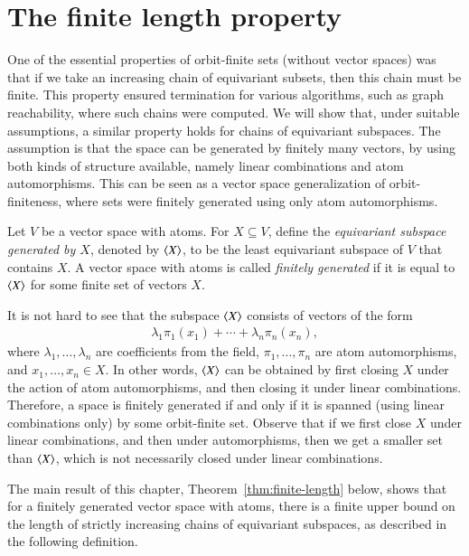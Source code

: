 \section{The finite length property}
\label{sec:finite-length}
One of the essential properties of orbit-finite sets (without vector spaces) was that if we take an increasing chain of equivariant subsets, then this chain must be finite. This property ensured termination for various algorithms, such as graph reachability, where such chains were computed. We will show  that, under suitable assumptions, a similar property holds for chains of equivariant subspaces.  The assumption is that the space can be generated by finitely many vectors, by using both kinds of structure available, namely linear combinations and atom automorphisms. This can be seen as a vector space generalization of  orbit-finiteness, where sets were finitely generated using only atom automorphisms.


\begin{definition}
     Let $V$ be a vector space with atoms. For  $X \subseteq V$, define the \emph{equivariant subspace generated by $X$}, denoted by 
    $\langle X \rangle$, to be the least equivariant subspace of $V$ that contains $X$.  A vector space with atoms is called \emph{finitely generated} if it is equal to $\langle X \rangle$ for some finite set of vectors $X$. 
\end{definition}

It is not hard to see that the subspace $\langle X \rangle$ consists of vectors of the form  
\begin{align*}
\lambda_1 \pi_1(x_1) + \cdots + \lambda_n \pi_n(x_n),
\end{align*}
where $\lambda_1,\ldots,\lambda_n$ are coefficients from the field, $\pi_1,\ldots,\pi_n$ are atom automorphisms, and $x_1,\ldots,x_n \in X$. In other words,  $\langle X \rangle$ can  be obtained by first closing $X$ under the action of atom automorphisms, and then closing it under linear combinations. Therefore, a space is finitely generated if and only if it is spanned (using linear combinations only) by some orbit-finite set. Observe that if we first close $X$ under linear combinations, and then under automorphisms, then we get a smaller set than $\langle X \rangle$, which is not necessarily closed under linear combinations.


The main result of this chapter, Theorem~\ref{thm:finite-length} below, shows that for a finitely generated vector space with atoms, there is a finite upper bound on the length of strictly increasing chains of equivariant subspaces, as described in the following definition. 

